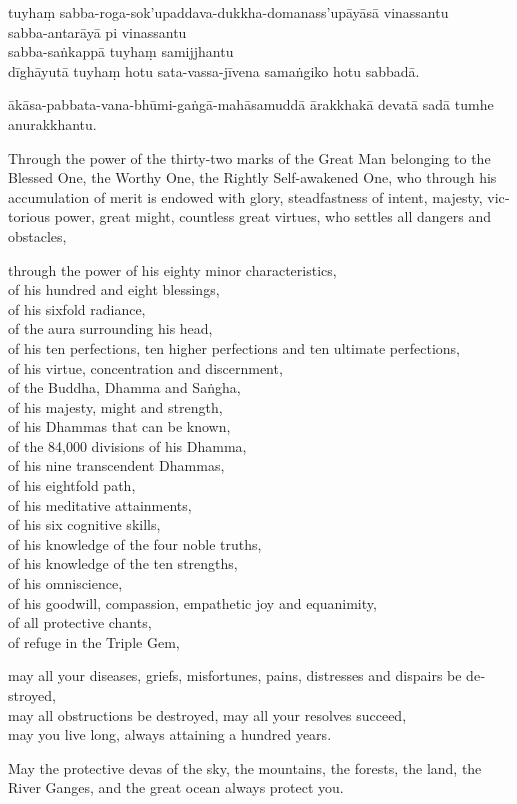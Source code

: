 tuyhaṃ sabba-roga-sok'upaddava-dukkha-domanass'upāyāsā vinassantu\\
sabba-antarāyā pi vinassantu\\
sabba-saṅkappā tuyhaṃ samijjhantu\\
dīghāyutā tuyhaṃ hotu sata-vassa-jīvena samaṅgiko hotu sabbadā.

ākāsa-pabbata-vana-bhūmi-gaṅgā-mahāsamuddā ārakkhakā
devatā sadā tumhe anurakkhantu.


\begin{english}
  Through the power of the thirty-two marks of the Great Man belonging to the
  Blessed One, the Worthy One, the Rightly Self-awakened One, who through his
  accumulation of merit is endowed with glory, steadfastness of intent, majesty,
  victorious power, great might, countless great virtues, who settles all
  dangers and obstacles,

  through the power of his eighty minor characteristics,\\
  of his hundred and eight blessings,\\
  of his sixfold radiance,\\
  of the aura surrounding his head,\\
  of his ten perfections, ten higher perfections and ten ultimate perfections,\\
  of his virtue, concentration and discernment,\\
  of the Buddha, Dhamma and Saṅgha,\\
  of his majesty, might and strength,\\
  of his Dhammas that can be known,\\
  of the 84,000 divisions of his Dhamma,\\
  of his nine transcendent Dhammas,\\
  of his eightfold path,\\
  of his meditative attainments,\\
  of his six cognitive skills,\\
  of his knowledge of the four noble truths,\\
  of his knowledge of the ten strengths,\\
  of his omniscience,\\
  of his goodwill, compassion, empathetic joy and equanimity,\\
  of all protective chants,\\
  of refuge in the Triple Gem,

  may all your diseases, griefs, misfortunes, pains, distresses and dispairs be destroyed,\\
  may all obstructions be destroyed, may all your resolves succeed,\\
  may you live long, always attaining a hundred years.

  May the protective devas of the sky, the mountains, the forests, the land, the
  River Ganges, and the great ocean always protect you.
\end{english}


